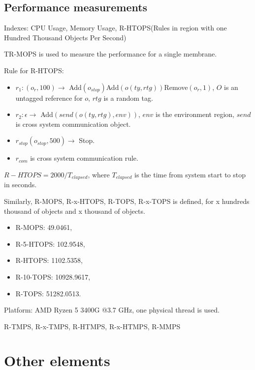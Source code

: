\documentclass[9pt,a4paper,twoside]{article}
\begin{document}
    \subsection{Performance measurements}
    
    Indexes: CPU Usage, Memory Usage, R-HTOPS(Rules in region with one Hundred Thousand Objects Per Second)

    TR-MOPS is used to measure the performance for a single membrane.

    Rule for R-HTOPS: 
    \begin{itemize}
        \item $r_1: (o_r, 100) \rightarrow$ Add$(o_{stop})$Add$(o(ty, rtg))$Remove$(o_r, 1)$, $O$ is an untagged reference for $o$, $rtg$ is a random tag.
        \item $r_2: \epsilon \rightarrow$ Add$(send(o(ty, rtg), env))$, $env$ is the environment region, $send$ is cross system communication object.
        \item $r_{stop} (o_{stop}, 500) \rightarrow$ Stop. 
        \item $r_{com}$ is cross system communication rule.
    \end{itemize}

    $R-HTOPS = 2000 / T_{elapsed}$, where $T_{elapsed}$ is the time from system start to stop in seconds.

    Similarly, R-MOPS, R-x-HTOPS,  R-TOPS, R-x-TOPS is defined, for x hundreds thousand of objects and x thousand of objects.

    \begin{itemize}
        \item R-MOPS: 49.0461,
        \item R-5-HTOPS: 102.9548, 
        \item R-HTOPS: 1102.5358,
        \item R-10-TOPS: 10928.9617,
        \item R-TOPS: 51282.0513.
    \end{itemize}
 
    Platform: AMD Ryzen 5 3400G @3.7 GHz, one physical thread is used.
    
    R-TMPS, R-x-TMPS, R-HTMPS, R-x-HTMPS, R-MMPS
    
    \section{Other elements}

        
\end{document}
